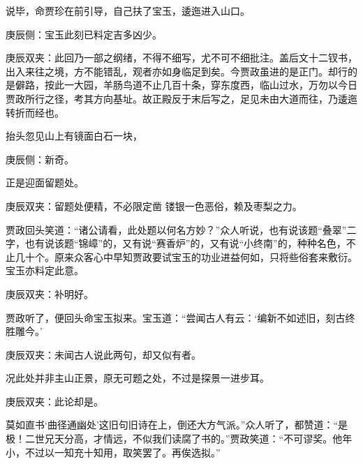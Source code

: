 \begin{parag}
    说毕，命贾珍在前引导，自己扶了宝玉，逶迤进入山口。\begin{note}庚辰侧：宝玉此刻已料定吉多凶少。\end{note}\begin{note}庚辰双夹：此回乃一部之纲绪，不得不细写，尤不可不细批注。盖后文十二钗书，出入来往之境，方不能错乱，观者亦如身临足到矣。今贾政虽进的是正门。却行的是僻路，按此一大园，羊肠鸟道不止几百十条，穿东度西，临山过水，万勿以今日贾政所行之径，考其方向基址。故正殿反于末后写之，足见未由大道而往，乃逶迤转折而经也。\end{note}抬头忽见山上有镜面白石一块，\begin{note}庚辰侧：新奇。\end{note}正是迎面留题处。\begin{note}庚辰双夹：留题处便精，不必限定凿 镂银一色恶俗，赖及枣梨之力。\end{note}贾政回头笑道：“诸公请看，此处题以何名方妙？”众人听说，也有说该题“叠翠”二字，也有说该题“锦嶂”的，又有说“赛香炉”的，又有说“小终南”的，种种名色，不止几十个。原来众客心中早知贾政要试宝玉的功业进益何如，只将些俗套来敷衍。宝玉亦料定此意。\begin{note}庚辰双夹：补明好。\end{note}贾政听了，便回头命宝玉拟来。宝玉道：“尝闻古人有云：‘编新不如述旧，刻古终胜雕今。’\begin{note}庚辰双夹：未闻古人说此两句，却又似有者。\end{note}况此处并非主山正景，原无可题之处，不过是探景一进步耳。\begin{note}庚辰双夹：此论却是。\end{note}莫如直书‘曲径通幽处’这旧句旧诗在上，倒还大方气派。”众人听了，都赞道：“是极！二世兄天分高，才情远，不似我们读腐了书的。”贾政笑道：“不可谬奖。他年小，不过以一知充十知用，取笑罢了。再俟选拟。”
\end{parag}


